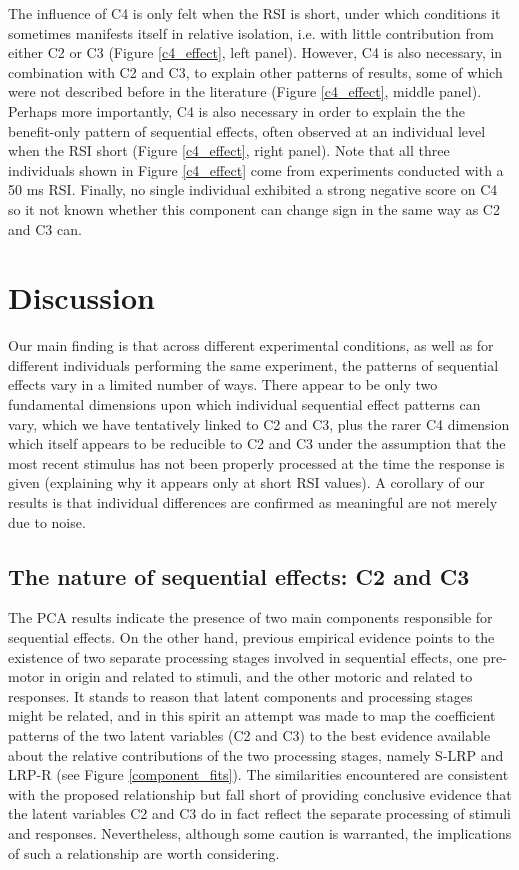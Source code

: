 \documentclass{apa}[12pt]
\begin{document}
The influence of C4 is only felt when the RSI is short, under which conditions it sometimes manifests itself in relative isolation,  i.e. with little contribution from either C2 or C3 (Figure \ref{c4_effect}, left panel). However, C4 is also necessary, in combination with C2 and C3, to explain other patterns of results, some of which were not described before in the literature (Figure \ref{c4_effect}, middle panel). Perhaps more importantly, C4 is also necessary in order to explain the the benefit-only pattern of sequential effects, often observed at an individual level when the RSI short (Figure \ref{c4_effect}, right panel). Note that all three individuals shown in Figure \ref{c4_effect} come from experiments conducted with a 50 ms RSI. Finally, no single individual exhibited a strong negative score on C4 so it not known whether this component can change sign in the same way as C2 and C3 can.



\section{Discussion}

Our main finding is that across different experimental conditions, as well as for different individuals performing the same experiment, the patterns of sequential effects vary in a limited number of ways. There appear to be only two fundamental dimensions upon which individual sequential effect patterns can vary, which we have tentatively linked to C2 and C3, plus the rarer C4 dimension which itself appears to be reducible to C2 and C3 under the assumption that the most recent stimulus has not been properly processed at the time the response is given (explaining why it appears only at short RSI values). A corollary of our results is that individual differences are confirmed as meaningful are not merely due to noise.


\subsection{The nature of sequential effects: C2 and C3}

The PCA results indicate the presence of two main components responsible for sequential effects. On the other hand, previous empirical evidence points to the existence of two separate processing stages involved in sequential effects, one pre-motor in origin and related to stimuli, and the other motoric and related to responses. It stands to reason that latent components and processing stages might be related, and in this spirit an attempt was made to map the coefficient patterns of the two latent variables (C2 and C3) to the best evidence available about the relative contributions of the two processing stages, namely S-LRP and LRP-R (see Figure \ref{component_fits}). The similarities encountered are consistent with the proposed relationship but fall short of providing conclusive evidence that the latent variables C2 and C3 do in fact reflect the separate processing of stimuli and responses. Nevertheless, although some caution is warranted, the implications of such a relationship are worth considering.
\end{document}
